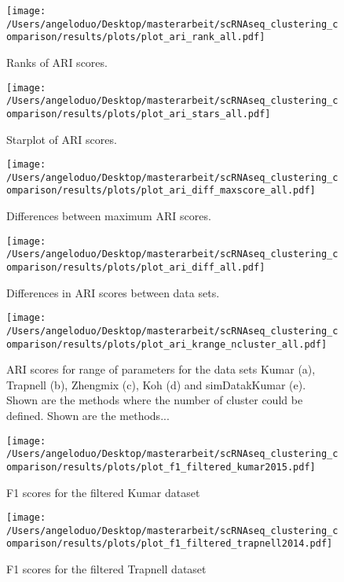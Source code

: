 \documentclass[11pt, a4paper]{article}\usepackage[]{graphicx}\usepackage[]{color}
\begin{document}
\begin{figure}[!h]
\texttt{[image: /Users/angeloduo/Desktop/masterarbeit/scRNAseq\_clustering\_comparison/results/plots/plot\_ari\_rank\_all.pdf]}
\caption{Ranks of ARI scores.  }
\label{fig:arirank}
\end{figure}

\begin{figure}[!h]
\texttt{[image: /Users/angeloduo/Desktop/masterarbeit/scRNAseq\_clustering\_comparison/results/plots/plot\_ari\_stars\_all.pdf]}
\caption{Starplot of ARI scores.  }
\label{fig:arirank}
\end{figure}


\begin{figure}[!h]
\texttt{[image: /Users/angeloduo/Desktop/masterarbeit/scRNAseq\_clustering\_comparison/results/plots/plot\_ari\_diff\_maxscore\_all.pdf]}
\caption{Differences between maximum ARI scores.  }
\label{fig:aridiff1}
\end{figure}

\begin{figure}[!h]
\texttt{[image: /Users/angeloduo/Desktop/masterarbeit/scRNAseq\_clustering\_comparison/results/plots/plot\_ari\_diff\_all.pdf]}
\caption{Differences in ARI scores between  data sets.  }
\label{fig:aridiff1}
\end{figure}



\begin{figure}[!h]
\texttt{[image: /Users/angeloduo/Desktop/masterarbeit/scRNAseq\_clustering\_comparison/results/plots/plot\_ari\_krange\_ncluster\_all.pdf]}
\caption{ARI scores for range of parameters for the data sets Kumar (a), Trapnell (b), Zhengmix (c), Koh (d) and simDatakKumar (e). Shown are the methods where the number of cluster could be defined. Shown are the methods...}
\label{fig:arirangeall}
\end{figure}


\begin{figure}[!h]
\texttt{[image: /Users/angeloduo/Desktop/masterarbeit/scRNAseq\_clustering\_comparison/results/plots/plot\_f1\_filtered\_kumar2015.pdf]}
\caption{F1 scores for the filtered Kumar dataset }
\label{fig:f1kumar}
\end{figure}

\begin{figure}[!h]
\texttt{[image: /Users/angeloduo/Desktop/masterarbeit/scRNAseq\_clustering\_comparison/results/plots/plot\_f1\_filtered\_trapnell2014.pdf]}
\caption{F1 scores for  the filtered Trapnell dataset }
\label{fig:f1trapnell}
\end{figure}
\end{document}
